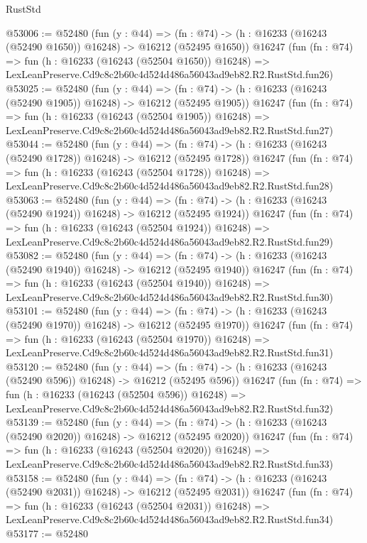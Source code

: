 \begin{lexlean}{RustStd}
\begin{coremodule}
@53006 := @52480
    (fun (y : @44) =>
    (fn : @74) -> (h : @16233 (@16243 (@52490 @1650)) @16248) -> @16212 (@52495 @1650))
    @16247
    (fun (fn : @74) =>
    fun (h : @16233 (@16243 (@52504 @1650)) @16248) =>
    LexLeanPreserve.Cd9c8c2b60c4d524d486a56043ad9eb82.R2.RustStd.fun26)
@53025 := @52480
    (fun (y : @44) =>
    (fn : @74) -> (h : @16233 (@16243 (@52490 @1905)) @16248) -> @16212 (@52495 @1905))
    @16247
    (fun (fn : @74) =>
    fun (h : @16233 (@16243 (@52504 @1905)) @16248) =>
    LexLeanPreserve.Cd9c8c2b60c4d524d486a56043ad9eb82.R2.RustStd.fun27)
@53044 := @52480
    (fun (y : @44) =>
    (fn : @74) -> (h : @16233 (@16243 (@52490 @1728)) @16248) -> @16212 (@52495 @1728))
    @16247
    (fun (fn : @74) =>
    fun (h : @16233 (@16243 (@52504 @1728)) @16248) =>
    LexLeanPreserve.Cd9c8c2b60c4d524d486a56043ad9eb82.R2.RustStd.fun28)
@53063 := @52480
    (fun (y : @44) =>
    (fn : @74) -> (h : @16233 (@16243 (@52490 @1924)) @16248) -> @16212 (@52495 @1924))
    @16247
    (fun (fn : @74) =>
    fun (h : @16233 (@16243 (@52504 @1924)) @16248) =>
    LexLeanPreserve.Cd9c8c2b60c4d524d486a56043ad9eb82.R2.RustStd.fun29)
@53082 := @52480
    (fun (y : @44) =>
    (fn : @74) -> (h : @16233 (@16243 (@52490 @1940)) @16248) -> @16212 (@52495 @1940))
    @16247
    (fun (fn : @74) =>
    fun (h : @16233 (@16243 (@52504 @1940)) @16248) =>
    LexLeanPreserve.Cd9c8c2b60c4d524d486a56043ad9eb82.R2.RustStd.fun30)
@53101 := @52480
    (fun (y : @44) =>
    (fn : @74) -> (h : @16233 (@16243 (@52490 @1970)) @16248) -> @16212 (@52495 @1970))
    @16247
    (fun (fn : @74) =>
    fun (h : @16233 (@16243 (@52504 @1970)) @16248) =>
    LexLeanPreserve.Cd9c8c2b60c4d524d486a56043ad9eb82.R2.RustStd.fun31)
@53120 := @52480
    (fun (y : @44) =>
    (fn : @74) -> (h : @16233 (@16243 (@52490 @596)) @16248) -> @16212 (@52495 @596))
    @16247
    (fun (fn : @74) =>
    fun (h : @16233 (@16243 (@52504 @596)) @16248) =>
    LexLeanPreserve.Cd9c8c2b60c4d524d486a56043ad9eb82.R2.RustStd.fun32)
@53139 := @52480
    (fun (y : @44) =>
    (fn : @74) -> (h : @16233 (@16243 (@52490 @2020)) @16248) -> @16212 (@52495 @2020))
    @16247
    (fun (fn : @74) =>
    fun (h : @16233 (@16243 (@52504 @2020)) @16248) =>
    LexLeanPreserve.Cd9c8c2b60c4d524d486a56043ad9eb82.R2.RustStd.fun33)
@53158 := @52480
    (fun (y : @44) =>
    (fn : @74) -> (h : @16233 (@16243 (@52490 @2031)) @16248) -> @16212 (@52495 @2031))
    @16247
    (fun (fn : @74) =>
    fun (h : @16233 (@16243 (@52504 @2031)) @16248) =>
    LexLeanPreserve.Cd9c8c2b60c4d524d486a56043ad9eb82.R2.RustStd.fun34)
@53177 := @52480

\end{coremodule}
\end{lexlean}
